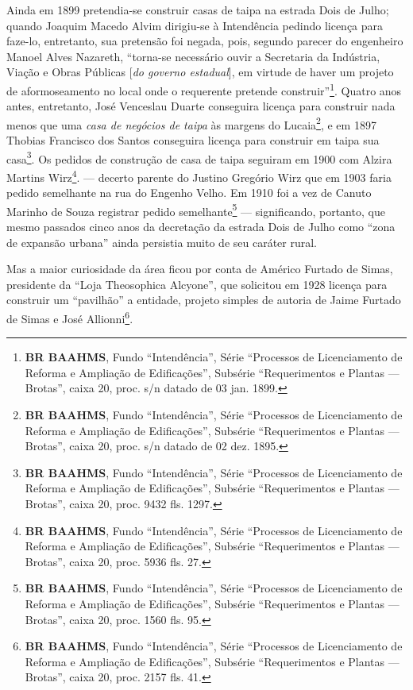 Ainda em 1899 pretendia-se construir casas de taipa na estrada Dois de Julho; quando Joaquim Macedo Alvim dirigiu-se à Intendência pedindo licença para faze-lo, entretanto, sua pretensão foi negada, pois, segundo parecer do engenheiro Manoel Alves Nazareth, ``torna-se necessário ouvir a Secretaria da Indústria, Viação e Obras Públicas [\textit{do governo estadual}], em virtude de haver um projeto de aformoseamento no local onde o requerente pretende construir''\footnote{\textbf{BR BAAHMS}, Fundo ``Intendência'', Série ``Processos de Licenciamento de Reforma e Ampliação de Edificações'', Subsérie ``Requerimentos e Plantas --- Brotas'', caixa 20, proc. s/n datado de 03 jan. 1899.}. Quatro anos antes, entretanto, José Venceslau Duarte conseguira licença para construir nada menos que uma \textit{casa de negócios de taipa} às margens do Lucaia\footnote{\textbf{BR BAAHMS}, Fundo ``Intendência'', Série ``Processos de Licenciamento de Reforma e Ampliação de Edificações'', Subsérie ``Requerimentos e Plantas --- Brotas'', caixa 20, proc. s/n datado de 02 dez. 1895.}, e em 1897 Thobias Francisco dos Santos conseguira licença para construir em taipa sua casa\footnote{\textbf{BR BAAHMS}, Fundo ``Intendência'', Série ``Processos de Licenciamento de Reforma e Ampliação de Edificações'', Subsérie ``Requerimentos e Plantas --- Brotas'', caixa 20, proc. 9432 fls. 1297.}. Os pedidos de construção de casa de taipa seguiram em 1900 com Alzira Martins Wirz\footnote{\textbf{BR BAAHMS}, Fundo ``Intendência'', Série ``Processos de Licenciamento de Reforma e Ampliação de Edificações'', Subsérie ``Requerimentos e Plantas --- Brotas'', caixa 20, proc. 5936 fls. 27.}. --- decerto parente do Justino Gregório Wirz que em 1903 faria pedido semelhante na rua do Engenho Velho. Em 1910 foi a vez de Canuto Marinho de Souza registrar pedido semelhante\footnote{\textbf{BR BAAHMS}, Fundo ``Intendência'', Série ``Processos de Licenciamento de Reforma e Ampliação de Edificações'', Subsérie ``Requerimentos e Plantas --- Brotas'', caixa 20, proc. 1560 fls. 95.} --- significando, portanto, que mesmo passados cinco anos da decretação da estrada Dois de Julho como ``zona de expansão urbana'' ainda persistia muito de seu caráter rural. 


Mas a maior curiosidade da área ficou por conta de Américo Furtado de Simas, presidente da ``Loja Theosophica Alcyone'', que solicitou em 1928 licença para construir um ``pavilhão'' a entidade, projeto simples de autoria de Jaime Furtado de Simas e José Allionni\footnote{\textbf{BR BAAHMS}, Fundo ``Intendência'', Série ``Processos de Licenciamento de Reforma e Ampliação de Edificações'', Subsérie ``Requerimentos e Plantas --- Brotas'', caixa 20, proc. 2157 fls. 41.}.

